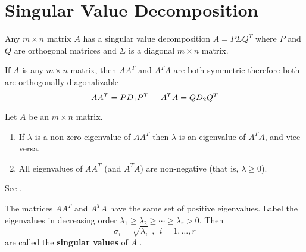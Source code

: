 \section{Singular Value Decomposition}

\begin{bigidea}
Any $m \times n$ matrix $A$ has a singular value decomposition $A = P \Sigma Q^T$ where $P$ and $Q$ are orthogonal matrices and $\Sigma$ is a diagonal $m \times n$ matrix.
\end{bigidea}

\begin{note}
If $A$ is any $m \times n$ matrix, then $AA^T$ and $A^TA$ are both symmetric therefore both are orthogonally diagonalizable
$$
AA^T = PD_1P^T \hspace{5mm} A^TA = QD_2Q^T
$$
\end{note}

\begin{proposition}
Let $A$ be an $m \times n$ matrix.
\begin{enumerate}
\item If $\lambda$ is a non-zero eigenvalue of $AA^T$ then $\lambda$ is an eigenvalue of $A^TA$, and vice versa.
\item All eigenvalues of $AA^T$ (and $A^TA$) are non-negative (that is, $\lambda \geq 0$).
\end{enumerate}
See \cite[p.446]{KN}.
\end{proposition}

\begin{definition}
The matrices $AA^T$ and $A^TA$ have the same set of positive eigenvalues. Label the eigenvalues in decreasing order $\lambda_1 \geq \lambda_2 \geq \cdots \geq \lambda_r > 0$. Then
$$
\sigma_i = \sqrt{\lambda_i} \ \  , \ \ i=1,\dots,r
$$
are called the {\bf singular values} of $A$ \cite[p.447]{KN}.
\end{definition}

